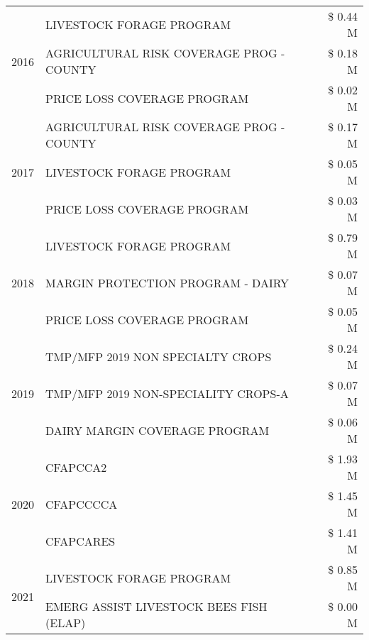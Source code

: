 \begin{tabular}{llr}
\cline{1-3}
\multirow[t]{3}{*}{2016} & LIVESTOCK FORAGE PROGRAM & \$ 0.44 M \\
 & AGRICULTURAL RISK COVERAGE PROG - COUNTY & \$ 0.18 M \\
 & PRICE LOSS COVERAGE PROGRAM & \$ 0.02 M \\
\cline{1-3}
\multirow[t]{3}{*}{2017} & AGRICULTURAL RISK COVERAGE PROG - COUNTY & \$ 0.17 M \\
 & LIVESTOCK FORAGE PROGRAM & \$ 0.05 M \\
 & PRICE LOSS COVERAGE PROGRAM & \$ 0.03 M \\
\cline{1-3}
\multirow[t]{3}{*}{2018} & LIVESTOCK FORAGE PROGRAM & \$ 0.79 M \\
 & MARGIN PROTECTION PROGRAM - DAIRY & \$ 0.07 M \\
 & PRICE LOSS COVERAGE PROGRAM & \$ 0.05 M \\
\cline{1-3}
\multirow[t]{3}{*}{2019} & TMP/MFP 2019 NON SPECIALTY CROPS & \$ 0.24 M \\
 & TMP/MFP 2019 NON-SPECIALITY CROPS-A & \$ 0.07 M \\
 & DAIRY MARGIN COVERAGE PROGRAM & \$ 0.06 M \\
\cline{1-3}
\multirow[t]{3}{*}{2020} & CFAPCCA2 & \$ 1.93 M \\
 & CFAPCCCCA & \$ 1.45 M \\
 & CFAPCARES & \$ 1.41 M \\
\cline{1-3}
\multirow[t]{2}{*}{2021} & LIVESTOCK FORAGE PROGRAM & \$ 0.85 M \\
 & EMERG ASSIST LIVESTOCK BEES FISH (ELAP) & \$ 0.00 M \\
\cline{1-3}
\bottomrule
\end{tabular}
